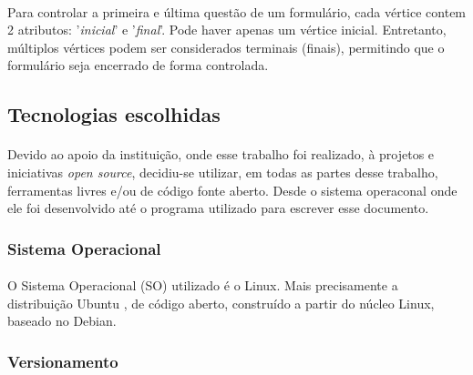 \documentclass[11pt]{article}
\begin{document}
        \paragraph{}
        
        Para controlar a primeira e última questão de um formulário, cada
        vértice contem 2 atributos: '{\em inicial}' e '{\em final}'. Pode haver
        apenas um vértice inicial. Entretanto, múltiplos vértices podem ser
        considerados terminais (finais), permitindo que o formulário seja 
        encerrado de forma controlada.
        
      \subsection{Tecnologias escolhidas}
        
        \paragraph{}
        
        Devido ao apoio da instituição, onde esse trabalho foi realizado,
        à projetos e iniciativas {\em open source}, decidiu-se utilizar,
        em todas as partes desse trabalho, ferramentas livres e/ou de código fonte aberto.
        Desde o sistema operaconal onde ele foi desenvolvido até
        o programa utilizado para escrever esse documento.
        
        \subsubsection{Sistema Operacional}

          \paragraph{}
          
          O Sistema Operacional (SO) utilizado é o Linux. Mais 
          precisamente a distribuição Ubuntu \cite{website:ubuntu}, de código aberto, 
          construído a partir do núcleo Linux, baseado no Debian.
          
        \subsubsection{Versionamento}

          \paragraph{}
          
\end{document}
